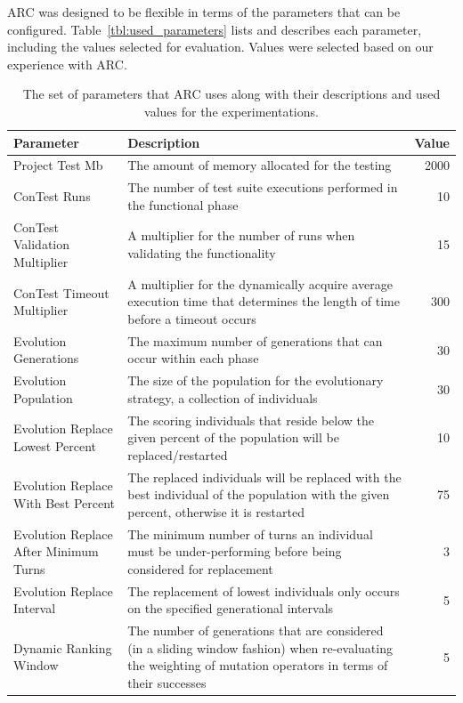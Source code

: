 \documentclass{llncs}
\begin{document}
ARC was designed to be flexible in terms of the parameters that can be
configured. Table~\ref{tbl:used_parameters} lists and describes each parameter,
including the values selected for evaluation. Values were selected based on our
experience with ARC.

\begin{table}[!t]
\caption{The set of parameters that ARC uses along with their descriptions and
used values for the experimentations.}
\begin{center}
\begin{tabular}{|p{3cm}|p{10cm}|r|}
\hline
\textbf{Parameter} & \textbf{Description} & \textbf{Value}\\
\hline
Project Test Mb & The amount of memory allocated for the testing & 2000\\
\hline
ConTest Runs & The number of test suite executions performed in the functional phase & 10\\
\hline
ConTest Validation Multiplier & A multiplier for the number of runs when validating the functionality & 15\\
\hline
ConTest Timeout Multiplier & A multiplier for the dynamically acquire average execution time that determines the length of time before a timeout occurs & 300\\
\hline
Evolution Generations & The maximum number of generations that can occur within each phase & 30\\
\hline
Evolution Population & The size of the population for the evolutionary strategy, a collection of individuals & 30\\
\hline
Evolution Replace Lowest Percent & The scoring individuals that reside below the given percent of the population will be replaced/restarted & 10\\
\hline
Evolution Replace With Best Percent & The replaced individuals will be replaced with the best individual of the population with the given percent, otherwise it is restarted & 75\\
\hline
Evolution Replace After Minimum Turns & The minimum number of turns an individual must be under-performing before being considered for replacement & 3\\
\hline
Evolution Replace Interval & The replacement of lowest individuals only occurs on the specified generational intervals & 5\\
\hline
Dynamic Ranking Window & The number of generations that are considered (in a sliding window fashion) when re-evaluating the weighting of mutation operators in terms of their successes & 5\\

\end{tabular}
\end{center}
\end{table}
\end{document}
